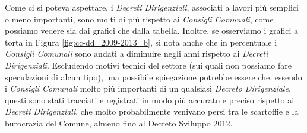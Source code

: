 			Come ci si poteva aspettare, i \textit{Decreti Dirigenziali}, associati a lavori più semplici o meno importanti, sono molti di più rispetto ai \textit{Consigli Comunali}, come possiamo vedere sia dai grafici che dalla tabella. Inoltre, se osserviamo i grafici a torta in Figura \ref{fig:cc-dd_2009-2013_b}, si nota anche che in percentuale i \textit{Consigli Comunali} sono andati a diminuire negli anni rispetto ai \textit{Decreti Dirigenziali}. Escludendo motivi tecnici del settore (sui quali non possiamo fare speculazioni di alcun tipo), una possibile spiegazione potrebbe essere che, essendo i \textit{Consigli Comunali} molto più importanti di un qualsiasi \textit{Decreto Dirigenziale}, questi sono stati tracciati e registrati in modo più accurato e preciso rispetto ai \textit{Decreti Dirigenziali}, che molto probabilmente venivano persi tra le scartoffie e la burocrazia del Comune, almeno fino al Decreto Sviluppo 2012.
			
			\FloatBarrier